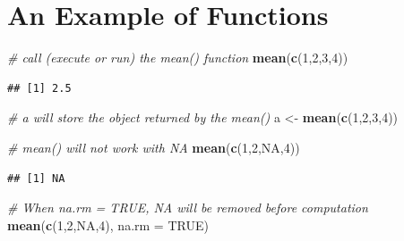 \documentclass[]{book}
\newenvironment{Shaded}{\begin{snugshade}}{\end{snugshade}}
\newcommand{\KeywordTok}[1]{\textcolor[rgb]{0.13,0.29,0.53}{\textbf{{#1}}}}
\newcommand{\DataTypeTok}[1]{\textcolor[rgb]{0.13,0.29,0.53}{{#1}}}
\newcommand{\DecValTok}[1]{\textcolor[rgb]{0.00,0.00,0.81}{{#1}}}
\newcommand{\StringTok}[1]{\textcolor[rgb]{0.31,0.60,0.02}{{#1}}}
\newcommand{\CommentTok}[1]{\textcolor[rgb]{0.56,0.35,0.01}{\textit{{#1}}}}
\newcommand{\OtherTok}[1]{\textcolor[rgb]{0.56,0.35,0.01}{{#1}}}
\newcommand{\NormalTok}[1]{{#1}}
\begin{document}
\section{An Example of Functions}\label{an-example-of-functions}

\begin{Shaded}
\begin{Highlighting}[]
\CommentTok{# call (execute or run) the mean() function}
\KeywordTok{mean}\NormalTok{(}\KeywordTok{c}\NormalTok{(}\DecValTok{1}\NormalTok{,}\DecValTok{2}\NormalTok{,}\DecValTok{3}\NormalTok{,}\DecValTok{4}\NormalTok{))    }
\end{Highlighting}
\end{Shaded}

\begin{verbatim}
## [1] 2.5
\end{verbatim}

\begin{Shaded}
\begin{Highlighting}[]
\CommentTok{# a will store the object returned by the mean()}
\NormalTok{a <-}\StringTok{ }\KeywordTok{mean}\NormalTok{(}\KeywordTok{c}\NormalTok{(}\DecValTok{1}\NormalTok{,}\DecValTok{2}\NormalTok{,}\DecValTok{3}\NormalTok{,}\DecValTok{4}\NormalTok{))   }
\end{Highlighting}
\end{Shaded}

\begin{Shaded}
\begin{Highlighting}[]
\CommentTok{# mean() will not work with NA}
\KeywordTok{mean}\NormalTok{(}\KeywordTok{c}\NormalTok{(}\DecValTok{1}\NormalTok{,}\DecValTok{2}\NormalTok{,}\OtherTok{NA}\NormalTok{,}\DecValTok{4}\NormalTok{))     }
\end{Highlighting}
\end{Shaded}

\begin{verbatim}
## [1] NA
\end{verbatim}

\begin{Shaded}
\begin{Highlighting}[]
\CommentTok{# When na.rm = TRUE, NA will be removed before computation}
\KeywordTok{mean}\NormalTok{(}\KeywordTok{c}\NormalTok{(}\DecValTok{1}\NormalTok{,}\DecValTok{2}\NormalTok{,}\OtherTok{NA}\NormalTok{,}\DecValTok{4}\NormalTok{), }\DataTypeTok{na.rm =} \OtherTok{TRUE}\NormalTok{)    }
\end{Highlighting}
\end{Shaded}
\end{document}
